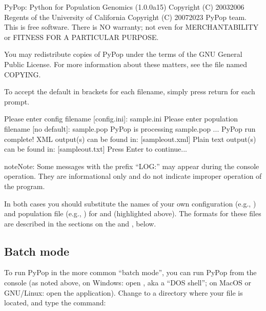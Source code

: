 \documentclass[letterpaper,10pt,english,openany,oneside]{sphinxmanual}
\begin{document}
%
\begin{sphinxVerbatim}[commandchars=\\\{\}]
PyPop: Python for Population Genomics (1.0.0a15)
Copyright (C) 2003\PYGZhy{}2006 Regents of the University of California
Copyright (C) 2007\PYGZhy{}2023 PyPop team.
This is free software.  There is NO warranty; not even for
MERCHANTABILITY or FITNESS FOR A PARTICULAR PURPOSE.

You may redistribute copies of PyPop under the terms of the GNU
General Public License.  For more information about these
matters, see the file named COPYING.

To accept the default in brackets for each filename, simply press
return for each prompt.

Please enter config filename [config.ini]: sample.ini
Please enter population filename [no default]: sample.pop
PyPop is processing sample.pop ...
PyPop run complete!
XML output(s) can be found in: [\PYGZsq{}sample\PYGZhy{}out.xml\PYGZsq{}]
Plain text output(s) can be found in: [\PYGZsq{}sample\PYGZhy{}out.txt\PYGZsq{}]
Press Enter to continue...
\end{sphinxVerbatim}
\sphinxresetverbatimhllines

\begin{sphinxadmonition}{note}{Note:}
\sphinxAtStartPar
Some messages with the prefix “LOG:” may appear during the console
operation.  They are informational only and do not indicate
improper operation of the program.
\end{sphinxadmonition}

\sphinxAtStartPar
In both cases you should substitute the names of your own
configuration (e.g., ) and population file (e.g.,
) for  and 
(highlighted above). The formats for these files are described in the
sections on the {\hyperref[\detokenize{docs/guide-chapter-usage:guide-usage-datafile}]{}} and
{\hyperref[\detokenize{docs/guide-chapter-usage:guide-usage-configfile}]{}}, below.


\subsection{Batch mode}
\label{\detokenize{docs/guide-chapter-usage:batch-mode}}
\sphinxAtStartPar
To run PyPop in the more common “batch mode”, you can run PyPop from
the console (as noted above, on Windows: open , aka a “DOS shell”; on MacOS or GNU/Linux: open the
 application). Change to a directory where your
 file is located, and type the command:
\end{document}
